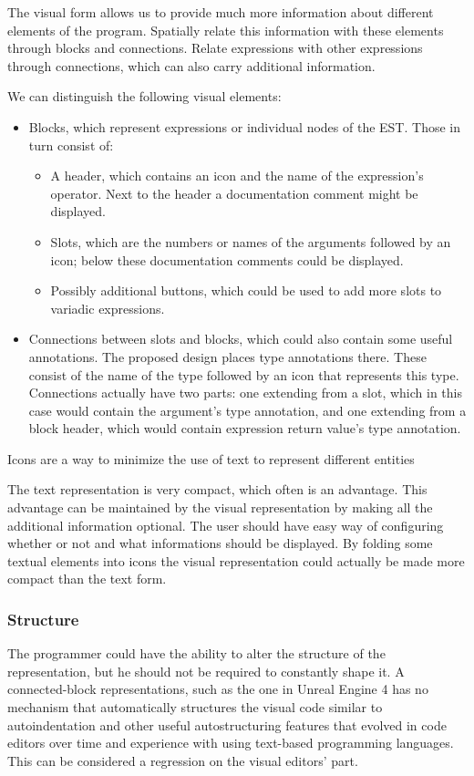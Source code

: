 The visual form allows us to provide much more information about different
elements of the program.  Spatially relate this information with these elements
through blocks and connections.  Relate expressions with other expressions
through connections, which can also carry additional information.

We can distinguish the following visual elements:
\begin{itemize}
	\item Blocks, which represent expressions or individual nodes of the
          EST. Those in turn consist of:
	\begin{itemize}
		\item A header, which contains an icon and the name of the
                  expression's operator. Next to the header a documentation
                  comment might be displayed.
		\item Slots, which are the numbers or names of the arguments
                  followed by an icon; below these documentation comments could
                  be displayed.
		\item Possibly additional buttons, which could be used to add
                  more slots to variadic expressions.
	\end{itemize}
	\item Connections between slots and blocks, which could also contain
          some useful annotations. The proposed design places type annotations
          there. These consist of the name of the type followed by an icon that
          represents this type. Connections actually have two parts: one
          extending from a slot, which in this case would contain the argument's
          type annotation, and one extending from a block header, which would
          contain expression return value's type annotation.
\end{itemize}

Icons are a way to minimize the use of text to represent different entities

The text representation is very compact, which often is an advantage. This
advantage can be maintained by the visual representation by making all the
additional information optional. The user should have easy way of configuring
whether or not and what informations should be displayed. By folding some
textual elements into icons the visual representation could actually be made
more compact than the text form.

\subsubsection{Structure}
The programmer could have the ability to alter the structure of the
representation, but he should not be required to constantly shape it. A
connected-block representations, such as the one in Unreal Engine 4 has no
mechanism that automatically structures the visual code similar to
autoindentation and other useful autostructuring features that evolved in code
editors over time and experience with using text-based programming
languages. This can be considered a regression on the visual editors' part.

